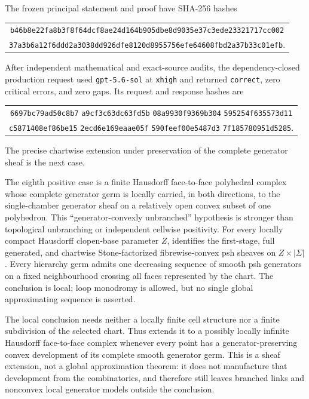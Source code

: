 The frozen principal statement and proof have SHA-256 hashes
\begin{center}
\small
\begin{tabular}{@{}c@{}}
\nolinkurl{b46b8e22fa8b3f8f64dcf8ae24d164b905dbe8d9035e37c3ede23321717cc002}\\
\nolinkurl{37a3b6a12f6ddd2a3038dd926dfe8120d8955756efe64608fbd2a37b33c01efb}.
\end{tabular}
\end{center}
After independent mathematical and exact-source audits, the
dependency-closed production request used \texttt{gpt-5.6-sol} at
\texttt{xhigh} and returned \texttt{correct}, zero critical errors, and
zero gaps.  Its request and response hashes are
\begin{center}
\small
\begin{tabular}{@{}c@{}}
\texttt{6697bc79ad50c8b7}\allowbreak
\texttt{a9cf3c63dc63fd5b}\allowbreak
\texttt{08a9930f9369b304}\allowbreak
\texttt{595254f635573d11}\\
\texttt{c5871408ef86be15}\allowbreak
\texttt{2ecd6e169eaae05f}\allowbreak
\texttt{590feef00e5487d3}\allowbreak
\texttt{7f185780951d5285}.
\end{tabular}
\end{center}
The precise chartwise extension under preservation of the complete
generator sheaf is the next case.

The eighth positive case is a finite Hausdorff face-to-face polyhedral
complex whose complete generator germ is locally carried, in both
directions, to the single-chamber generator sheaf on a relatively open
convex subset of one polyhedron.  This
``generator-convexly unbranched'' hypothesis is stronger than topological
unbranching or independent cellwise positivity.  For every locally compact
Hausdorff clopen-base parameter \(Z\),
 identifies the
first-stage, full generated, and chartwise Stone-factorized
fibrewise-convex psh sheaves on \(Z\times|\Sigma|\).  Every hierarchy germ
admits one decreasing sequence of smooth psh generators on a fixed
neighbourhood crossing all faces represented by the chart.  The conclusion
is local; loop monodromy is allowed, but no single global approximating
sequence is asserted.

The local conclusion needs neither a locally finite cell structure nor a
finite subdivision of the selected chart.  Thus
 extends it to a
possibly locally infinite Hausdorff face-to-face complex whenever every
point has a generator-preserving convex development of its complete smooth
generator germ.  This is a sheaf extension, not a global approximation
theorem: it does not manufacture that development from the combinatorics,
and therefore still leaves branched links and nonconvex local generator
models outside the conclusion.

